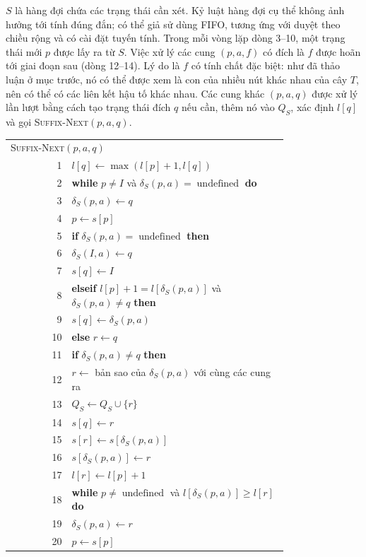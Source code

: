 \documentclass[11pt]{article}
\newcommand{\undefinedsym}{\operatorname{undefined}}
\begin{document}
$S$ là hàng đợi chứa các trạng thái cần xét. Kỷ luật hàng đợi cụ thể không ảnh
hưởng tới tính đúng đắn; có thể giả sử dùng FIFO, tương ứng với duyệt theo
chiều rộng và có cài đặt tuyến tính. Trong mỗi vòng lặp dòng 3--10, một trạng
thái mới $p$ được lấy ra từ $S$. Việc xử lý các cung $(p,a,f)$ có đích là $f$
được hoãn tới giai đoạn sau (dòng 12--14). Lý do là $f$ có tính chất đặc biệt:
như đã thảo luận ở mục trước, nó có thể được xem là con của nhiều nút khác
nhau của cây $T$, nên có thể có các liên kết hậu tố khác nhau. Các cung khác
$(p,a,q)$ được xử lý lần lượt bằng cách tạo trạng thái đích $q$ nếu cần, thêm
nó vào $Q_S$, xác định $l[q]$ và gọi \textsc{Suffix-Next}$(p,a,q)$.

\begin{center}
\begin{tabular}{r p{0.78\linewidth}}
\multicolumn{2}{l}{\textsc{Suffix-Next}$(p,a,q)$}\\
1 & $l[q]\leftarrow\max(l[p]+1,l[q])$\\
2 & \textbf{while} $p\ne I$ và $\delta_S(p,a)=\undefinedsym$ \textbf{do}\\
3 & \quad $\delta_S(p,a)\leftarrow q$\\
4 & \quad $p\leftarrow s[p]$\\
5 & \textbf{if} $\delta_S(p,a)=\undefinedsym$ \textbf{then}\\
6 & \quad $\delta_S(I,a)\leftarrow q$\\
7 & \quad $s[q]\leftarrow I$\\
8 & \textbf{elseif} $l[p]+1=l[\delta_S(p,a)]$ và $\delta_S(p,a)\ne q$
    \textbf{then}\\
9 & \quad $s[q]\leftarrow \delta_S(p,a)$\\
10 & \textbf{else} $r\leftarrow q$\\
11 & \quad \textbf{if} $\delta_S(p,a)\ne q$ \textbf{then}\\
12 & \quad\quad $r\leftarrow$ bản sao của $\delta_S(p,a)$ với cùng các cung ra\\
13 & \quad\quad $Q_S\leftarrow Q_S\cup\{r\}$\\
14 & \quad\quad $s[q]\leftarrow r$\\
15 & \quad $s[r]\leftarrow s[\delta_S(p,a)]$\\
16 & \quad $s[\delta_S(p,a)]\leftarrow r$\\
17 & \quad $l[r]\leftarrow l[p]+1$\\
18 & \quad \textbf{while} $p\ne\undefinedsym$ và $l[\delta_S(p,a)]\ge l[r]$
     \textbf{do}\\
19 & \quad\quad $\delta_S(p,a)\leftarrow r$\\
20 & \quad\quad $p\leftarrow s[p]$
\end{tabular}
\end{center}
\end{document}
